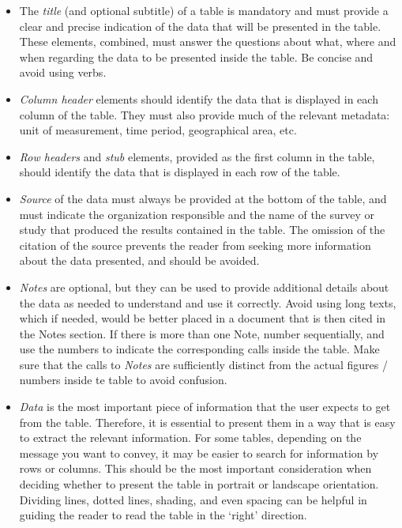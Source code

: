\documentclass[
  12pt,
]{book}
\begin{document}
\begin{itemize}
\item
  The \emph{title} (and optional subtitle) of a table is mandatory and must provide a clear and precise indication of the data that will be presented in the table. These elements, combined, must answer the questions about what, where and when regarding the data to be presented inside the table. Be concise and avoid using verbs.
\item
  \emph{Column header} elements should identify the data that is displayed in each column of the table. They must also provide much of the relevant metadata: unit of measurement, time period, geographical area, etc.
\item
  \emph{Row headers} and \emph{stub} elements, provided as the first column in the table, should identify the data that is displayed in each row of the table.
\item
  \emph{Source} of the data must always be provided at the bottom of the table, and must indicate the organization responsible and the name of the survey or study that produced the results contained in the table. The omission of the citation of the source prevents the reader from seeking more information about the data presented, and should be avoided.
\item
  \emph{Notes} are optional, but they can be used to provide additional details about the data as needed to understand and use it correctly. Avoid using long texts, which if needed, would be better placed in a document that is then cited in the Notes section. If there is more than one Note, number sequentially, and use the numbers to indicate the corresponding calls inside the table. Make sure that the calls to \emph{Notes} are sufficiently distinct from the actual figures / numbers inside te table to avoid confusion.
\item
  \emph{Data} is the most important piece of information that the user expects to get from the table. Therefore, it is essential to present them in a way that is easy to extract the relevant information. For some tables, depending on the message you want to convey, it may be easier to search for information by rows or columns. This should be the most important consideration when deciding whether to present the table in portrait or landscape orientation. Dividing lines, dotted lines, shading, and even spacing can be helpful in guiding the reader to read the table in the `right' direction.
\end{itemize}
\end{document}
